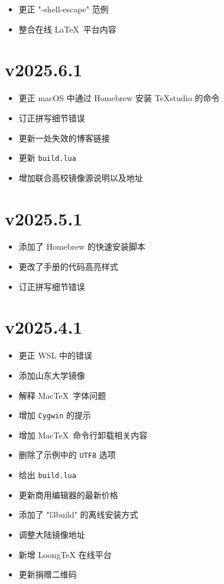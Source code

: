 \begin{itemize}
  \item 更正 "-shell-escape" 范例
  \item 整合在线 \LaTeX\ 平台内容
\end{itemize}

\section*{v2025.6.1}

\begin{itemize}
  \item 更正 macOS 中通过 Homebrew 安装 \TeX studio 的命令
  \item 订正拼写细节错误
  \item 更新一处失效的博客链接
  \item 更新 \texttt{build.lua}
  \item 增加联合高校镜像源说明以及地址
\end{itemize}

\section*{v2025.5.1}

\begin{itemize}
  \item 添加了 Homebrew 的快速安装脚本
  \item 更改了手册的代码高亮样式
  \item 订正拼写细节错误
\end{itemize}

\section*{v2025.4.1}

\begin{itemize}
  \item 更正 WSL 中的错误
  \item 添加山东大学镜像
  \item 解释 Mac\TeX\ 字体问题
  \item 增加 \texttt{Cygwin} 的提示
  \item 增加 Mac\TeX\ 命令行卸载相关内容
  \item 删除了示例中的 \texttt{UTF8} 选项
  \item 给出 \texttt{build.lua}
  \item 更新商用编辑器的最新价格
  \item 添加了 "l3build" 的离线安装方式
  \item 调整大陆镜像地址
  \item 新增 LoongTeX 在线平台
  \item 更新捐赠二维码
\end{itemize}

